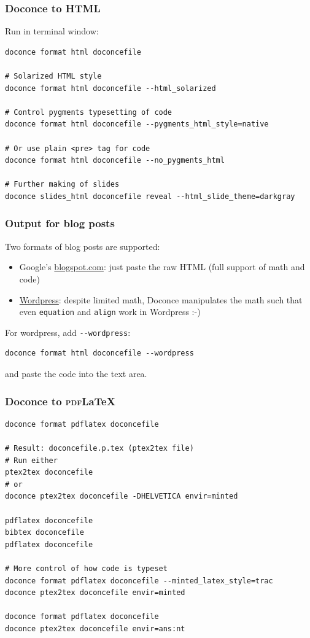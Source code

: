 \documentclass{beamer}
\newcounter{doconce:exercise:counter}
\newcounter{doconce:movie:counter}
\begin{document}
\begin{frame}
\frametitle{Doconce to HTML}

Run in terminal window:
\begin{Verbatim}[numbers=none,fontsize=\fontsize{9pt}{9pt},baselinestretch=0.95]
doconce format html doconcefile

# Solarized HTML style
doconce format html doconcefile --html_solarized

# Control pygments typesetting of code
doconce format html doconcefile --pygments_html_style=native

# Or use plain <pre> tag for code
doconce format html doconcefile --no_pygments_html

# Further making of slides
doconce slides_html doconcefile reveal --html_slide_theme=darkgray
\end{Verbatim}
\end{frame}

\begin{frame}
\frametitle{Output for blog posts}

Two formats of blog posts are supported:

\begin{itemize}
 \item Google's \href{{http://doconce-report-demo.blogspot.no/}}{blogspot.com}:
   just paste the raw HTML (full support of math and code)

 \item \href{{http://doconcereportdemo.wordpress.com/}}{Wordpress}:
   despite limited math, Doconce manipulates the math
   such that even \Verb!equation! and \Verb!align! work in Wordpress :-)
\end{itemize}

\noindent
For wordpress, add \Verb!--wordpress!:
\begin{Verbatim}[numbers=none,fontsize=\fontsize{9pt}{9pt},baselinestretch=0.95]
doconce format html doconcefile --wordpress
\end{Verbatim}
and paste the code into the text area.
\end{frame}

\begin{frame}
\frametitle{Doconce to \textsc{pdf}{\LaTeX}}

\begin{Verbatim}[numbers=none,fontsize=\fontsize{9pt}{9pt},baselinestretch=0.95]
doconce format pdflatex doconcefile

# Result: doconcefile.p.tex (ptex2tex file)
# Run either
ptex2tex doconcefile
# or
doconce ptex2tex doconcefile -DHELVETICA envir=minted

pdflatex doconcefile
bibtex doconcefile
pdflatex doconcefile

# More control of how code is typeset
doconce format pdflatex doconcefile --minted_latex_style=trac
doconce ptex2tex doconcefile envir=minted

doconce format pdflatex doconcefile
doconce ptex2tex doconcefile envir=ans:nt
\end{Verbatim}
\end{frame}
\end{document}
